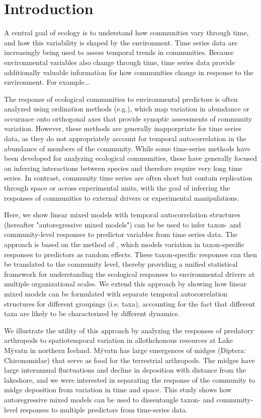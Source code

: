

\section*{Introduction}


A central goal of ecology is to understand how communities vary through time, and
how this variability is shaped by the environment.
Time series data are increasingly being used to assess temporal trends in communities.
Because environmental variables also change through time, time series data provide
additionally valuable information for how communities change in response to the
environment. For example...

The response of ecological communities to environmental predictors is often analyzed using
ordination methods (e.g.), which map variation in abundance or occurnace onto orthogonal
axes that provide synoptic assessments of community variation. However, these methods
are generally inapporpriate for time series data, as they do not appropriately account
for temporal autocorrelation in the abundance of members of the community.
While some time-series methods have been developed for analyzing ecological communities,
these have generally focused on inferring interactions between species and therefore
require very long time series. In contrast, community time series are often short but
contain replication through space or across experimental units, with the goal of inferring
the responses of communities to external drivers or experimental manipulations.

Here, we show linear mixed models with temporal autocorrelation structures
(hereafter "autoregressive mixed models") can be be used to infer taxon- and
community-level responses to predictor variables from time series data. The
approach is based on the method of \cite{Jackson2012}, which models variation in
taxon-specific responses to predictors as random effects. These taxon-specific responses
can then be translated to the community level, thereby providing a unified statistical
framework for understanding the ecological responses to environmental drivers at multiple
organizational scales. We extend this approach by showing how linear mixed models can be
formulated with separate temporal autocorrelation structures for different groupings
(i.e. taxa), accounting for the fact that different taxa are likely to be characterized by
different dynamics.

We illustrate the utility of this approach by analyzing the responses of predatory
arthropods to spatiotemporal variation in allothchonous resources
at Lake M\`{y}vatn in northern Iceland. M\'{y}vatn has large emergences of midges
(Diptera: Chironomidae) that serve as food for the terrestrial arthropods.
The midges have large interannual fluctuations and decline in deposition
with distance from the lakeshore, and we were interested in separating the response
of the community to midge deposition from variation in time and space.
This study shows how autoregressive mixed models can be used to dissentangle
taxon- and community-level responses to multiple predictors from time-series data.






